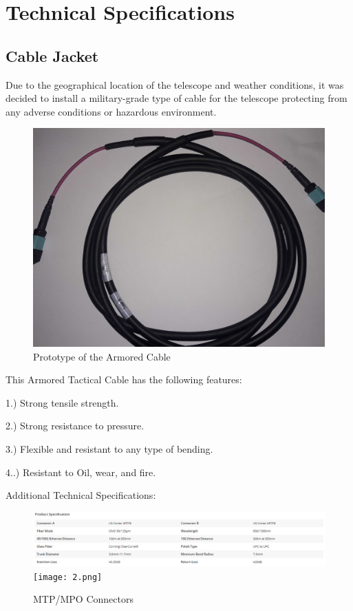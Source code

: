 \section{Technical Specifications}

\subsection{Cable Jacket}

Due to the geographical location of the telescope and weather conditions, it was decided to install a military-grade type of cable for the telescope protecting from any adverse conditions or hazardous environment. 

\begin{figure}
  \includegraphics[width=\textwidth]{images/mtp_militar_cable.jpg}
  \caption{Prototype of the Armored Cable}
  \label{fig:jlsimon}
\end{figure}

This Armored Tactical Cable has the following features:

1.) Strong tensile strength.

2.) Strong resistance to pressure.

3.) Flexible and resistant to any type of bending.

4..) Resistant to Oil, wear, and fire.


Additional Technical Specifications:

\begin{figure}
  \includegraphics[width=\textwidth]{images/2.png}
  \texttt{[image: 2.png]}
  \caption{MTP/MPO Connectors}
  \label{fig:jlsimon}
\end{figure}



